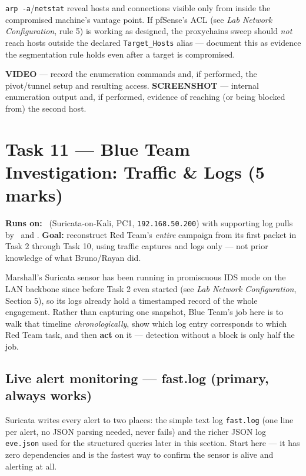 \documentclass[11pt,a4paper]{article}
\begin{document}
\begin{expectbox}
\texttt{arp -a}/\texttt{netstat} reveal hosts and connections visible only from inside
the compromised machine's vantage point. If pfSense's ACL (see
\emph{Lab Network Configuration}, rule 5) is working as designed, the proxychains sweep
should \emph{not} reach hosts outside the declared \texttt{Target\_Hosts} alias ---
document this as evidence the segmentation rule holds even after a target is
compromised.
\end{expectbox}

\begin{notebox}
\textbf{VIDEO} --- record the enumeration commands and, if performed, the pivot/tunnel
setup and resulting access. \textbf{SCREENSHOT} --- internal enumeration output and,
if performed, evidence of reaching (or being blocked from) the second host.
\end{notebox}

\clearpage

\section{Task 11 --- Blue Team Investigation: Traffic \& Logs (5 marks)}
\textbf{Runs on:} \marshall\ (Suricata-on-Kali, PC1, \texttt{192.168.50.200}) with
supporting log pulls by \amina\ and \fahdil. \quad\textbf{Goal:} reconstruct Red Team's
\emph{entire} campaign from its first packet in Task 2 through Task 10, using traffic
captures and logs only --- not prior knowledge of what Bruno/Rayan did.

\begin{bluebox}
Marshall's Suricata sensor has been running in promiscuous IDS mode on the LAN backbone
since before Task 2 even started (see \emph{Lab Network Configuration}, Section 5), so
its logs already hold a timestamped record of the whole engagement. Rather than
capturing one snapshot, Blue Team's job here is to walk that timeline
\emph{chronologically}, show which log entry corresponds to which Red Team task, and
then \textbf{act} on it --- detection without a block is only half the job.
\end{bluebox}

\subsection{Live alert monitoring --- fast.log (primary, always works)}
Suricata writes every alert to two places: the simple text log
\texttt{fast.log} (one line per alert, no JSON parsing needed, never fails) and the
richer JSON log \texttt{eve.json} used for the structured queries later in this
section. Start here --- it has zero dependencies and is the fastest way to confirm the
sensor is alive and alerting at all.
\end{document}
